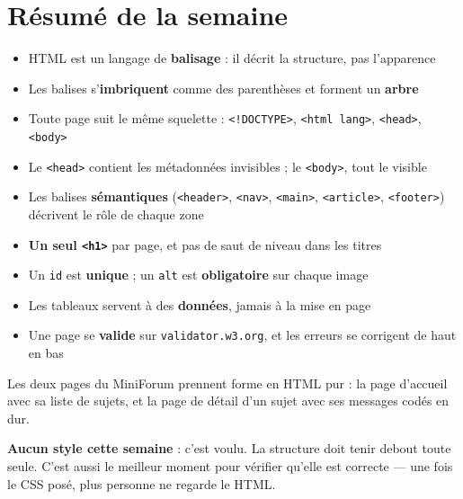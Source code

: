 \documentclass[a4paper,11pt]{article}
\begin{document}
\section*{Résumé de la semaine}

\begin{tcolorbox}[definition, title={Ce qu'il faut retenir}]
\begin{itemize}
  \item HTML est un langage de \textbf{balisage} : il décrit la structure, pas l'apparence
  \item Les balises s'\textbf{imbriquent} comme des parenthèses et forment un \textbf{arbre}
  \item Toute page suit le même squelette : \texttt{<!DOCTYPE>}, \texttt{<html lang>}, \texttt{<head>}, \texttt{<body>}
  \item Le \texttt{<head>} contient les métadonnées invisibles ; le \texttt{<body>}, tout le visible
  \item Les balises \textbf{sémantiques} (\texttt{<header>}, \texttt{<nav>}, \texttt{<main>}, \texttt{<article>}, \texttt{<footer>}) décrivent le rôle de chaque zone
  \item \textbf{Un seul \texttt{<h1>}} par page, et pas de saut de niveau dans les titres
  \item Un \texttt{id} est \textbf{unique} ; un \texttt{alt} est \textbf{obligatoire} sur chaque image
  \item Les tableaux servent à des \textbf{données}, jamais à la mise en page
  \item Une page se \textbf{valide} sur \texttt{validator.w3.org}, et les erreurs se corrigent de haut en bas
\end{itemize}
\end{tcolorbox}

\vspace{8pt}
\begin{tcolorbox}[filrouge, title={Fil rouge --- MiniForum : structure HTML du forum}]
Les deux pages du MiniForum prennent forme en HTML pur : la page d'accueil avec sa liste de sujets, et la page de détail d'un sujet avec ses messages codés en dur.

\vspace{4pt}
\textbf{Aucun style cette semaine} : c'est voulu. La structure doit tenir debout toute seule. C'est aussi le meilleur moment pour vérifier qu'elle est correcte --- une fois le CSS posé, plus personne ne regarde le HTML.
\end{tcolorbox}
\end{document}
